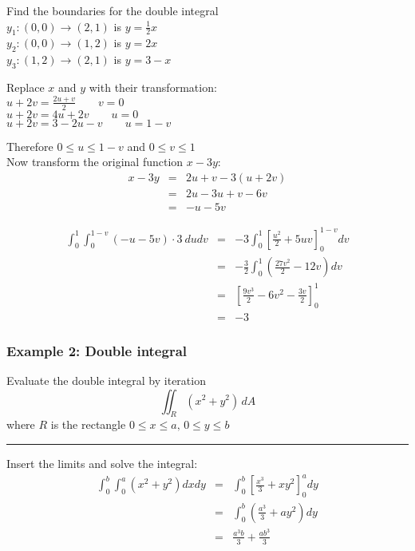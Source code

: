 Find the boundaries for the double integral\\
$y_1: (0,0) \to (2,1)$ is $y=\frac{1}{2}x$\\
$y_2: (0,0) \to (1,2)$ is $y=2x$\\
$y_3: (1,2) \to (2,1)$ is $y=3-x$

Replace $x$ and $y$ with their transformation:\\
$u+2v=\frac{2u+v}{2}\qquad v=0$\\
$u+2v=4u+2v\qquad u=0$\\
$u+2v=3-2u-v\qquad u=1-v$

Therefore $0\leq u\leq 1-v$ and $0\leq v\leq 1$\\
Now transform the original function $x-3y$:
\begin{eqnarray*}
  x-3y&=&2u+v-3(u+2v)\\
      &=&2u-3u+v-6v\\
      &=&-u-5v
\end{eqnarray*}

\begin{eqnarray*}
  \int_{0}^{1}\int_{0}^{1-v}(-u-5v)\cdot3\ dudv&=&-3 \int_{0}^{1} \left[\frac{u^2}{2}+5 u v\right]^{1-v}_0dv\\
                                               &=&-\frac{3}{2}\int_0^1\left(\frac{27 v^2}{2}-12 v\right)dv\\
                                               &=&\left[\frac{9 v^3}{2}-6 v^2-\frac{3 v}{2}\right]_0^1\\
                                               &=&\boxed{-3}
\end{eqnarray*}
\subsubsection{Example 2: Double integral}
Evaluate the double integral by iteration
$$\iint_{R}(x^{2}+y^{2})\,d A$$
where $R$ is the rectangle $0\leq x\leq a,\,0\leq y\leq b$

\noindent\rule{\textwidth}{1pt}

Insert the limits and solve the integral:
\begin{eqnarray*}
  \int_{0}^{b}\int_{0}^{a}(x^2+y^2)dxdy&=&\int_{0}^{b}\left[\frac{x^3}{3}+x y^2\right]^a_0dy\\
                                       &=&\int_{0}^{b}\left(\frac{a^3}{3}+a y^2\right)dy\\
                                       &=&\boxed{\frac{a^3 b}{3}+\frac{a b^3}{3}}
\end{eqnarray*}

